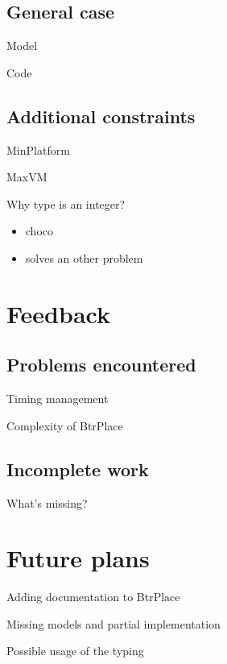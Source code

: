 \documentclass{beamer}
\begin{document}
\subsection{General case}
\begin{frame}{Model}
\end{frame}
\begin{frame}{Code}
\end{frame}

\subsection{Additional constraints}
\begin{frame}{MinPlatform}
\end{frame}
\begin{frame}{MaxVM}
\end{frame}

\begin{frame}{Why type is an integer?}
\begin{itemize}
	\item choco
	\item solves an other problem
\end{itemize}
\end{frame}

\section{Feedback}
\subsection{Problems encountered}
\begin{frame}{Timing management}
\end{frame}

\begin{frame}{Complexity of BtrPlace}
\end{frame}

\subsection{Incomplete work}
\begin{frame}{What's missing?}
\end{frame}

\section{Future plans}
\begin{frame}{Adding documentation to BtrPlace}
\end{frame}

\begin{frame}{Missing models and partial implementation}
\end{frame}

\begin{frame}{Possible usage of the typing}
\end{frame}
\end{document}
